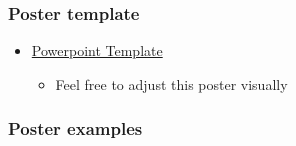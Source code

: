 \documentclass[
  letterpaper,
  DIV=11,
  numbers=noendperiod]{scrartcl}
\providecommand{\tightlist}{%
  \setlength{\itemsep}{0pt}\setlength{\parskip}{0pt}}
\begin{document}
\subsubsection{Poster template}\label{poster-template}

\begin{itemize}
\tightlist
\item
  \href{https://ohsuitg-my.sharepoint.com/:p:/r/personal/wakim_ohsu_edu/Documents/Teaching/Classes/BSTA_513_26S/Student_files_BSTA_513/Project/Resources/poster_template.pptx?d=wb113c78c33e4497fab393030df6448e6&csf=1&web=1&e=2STsp5}{Powerpoint
  Template}

  \begin{itemize}
  \tightlist
  \item
    Feel free to adjust this poster visually
  \end{itemize}
\end{itemize}

\subsubsection{Poster examples}\label{poster-examples}
\end{document}
